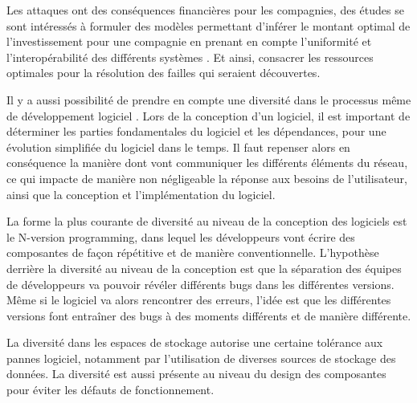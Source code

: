 Les attaques ont des conséquences financières pour les compagnies, des études se sont intéressés à formuler des modèles permettant d’inférer le montant optimal de l’investissement pour une compagnie en prenant en compte l’uniformité et l’interopérabilité des différents systèmes \cite{informationSecurity}. Et ainsi, consacrer les ressources optimales pour la résolution des failles qui seraient découvertes. 

Il y a aussi possibilité de prendre en compte une diversité dans le processus même de développement logiciel \cite{processDiversity}. 
Lors de la conception d’un logiciel, il est important de déterminer les parties fondamentales du logiciel et les dépendances, pour une évolution simplifiée du logiciel dans le temps. Il faut repenser alors en conséquence la manière dont vont communiquer les différents éléments du réseau, ce qui impacte de manière non négligeable la réponse aux besoins de l'utilisateur, ainsi que la conception et l'implémentation du logiciel.

La forme la plus courante de diversité au niveau de la conception des logiciels est le N-version programming\cite{ NversionProgramming }, dans lequel les développeurs vont écrire des composantes de façon répétitive et de manière conventionnelle. L’hypothèse derrière la diversité au niveau de la conception est que la séparation des équipes de développeurs va pouvoir révéler différents bugs dans les différentes versions. Même si le logiciel va alors rencontrer des erreurs, l’idée est que les différentes versions font entraîner des bugs à des moments différents et de manière différente. 

La diversité dans les espaces de stockage autorise une certaine tolérance aux pannes logiciel\cite{dataDiversity}, notamment par l'utilisation de diverses sources de stockage des données. La diversité est aussi présente au niveau du design des composantes pour éviter les défauts de fonctionnement\cite{SecurityThroughDiversity}.

